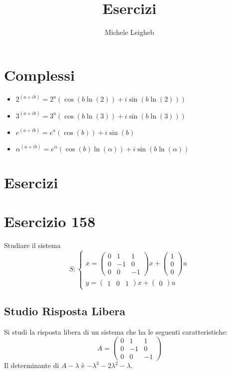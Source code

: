 \documentclass{article}
\title{Esercizi}
\author{Michele Leigheb}
\date{}
\begin{document}
\maketitle
\tableofcontents{}
\section{Complessi}
\begin{itemize}
	\item \(\displaystyle 2^{(a+ib)} = 2^a (\cos(b \ln(2)) + i\sin(b \ln(2))) \)
	\item \(\displaystyle 3^{(a+ib)} = 3^a (\cos(b \ln(3)) + i\sin(b \ln(3))) \)
	\item \(\displaystyle e^{(a+ib)} = e^a (\cos(b)) + i\sin(b) \)
	\item \(\displaystyle \alpha^{(a+ib)} = e^{\alpha} (\cos(b)\ln(\alpha)) + i\sin(b\ln(\alpha)) \)
\end{itemize}



\section{Esercizi}

\section{Esercizio 158 }
 Studiare il sistema \[S:\begin{cases}\overset{\cdot}{x} = \left(\begin{matrix}0 & 1 & 1\\0 & -1 & 0\\0 & 0 & -1\end{matrix}\right) x+ \left(\begin{matrix}1\\0\\0\end{matrix}\right)u\\y = \left(\begin{matrix}1 & 0 & 1\end{matrix}\right) x +\left(\begin{matrix}0\end{matrix}\right) u\end{cases}\]\subsection{Studio Risposta Libera}
Si studi la risposta libera di un sistema che ha le seguenti caratteristiche: \[A = \left(\begin{matrix}0 & 1 & 1\\0 & -1 & 0\\0 & 0 & -1\end{matrix}\right)\]
Il determinante di $A-\lambda$ è $ - \lambda^{3} - 2 \lambda^{2} - \lambda $.
\end{document}
